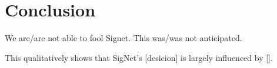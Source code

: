 \section{Conclusion}\label{sec:conclusion}

We are/are not able to fool Signet.
This was/was not anticipated.

This qualitatively shows that SigNet's [desicion] is largely influenced by [].
